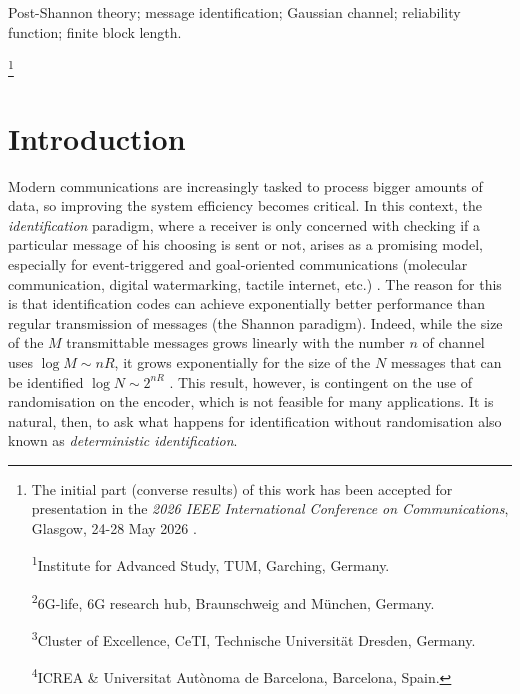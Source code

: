 \documentclass[10pt,conference]{IEEEtran}
\newcommand\blfootnote[1]{%
  \begingroup
  \renewcommand\thefootnote{}\footnote{#1}%
  \addtocounter{footnote}{-1}%
  \endgroup
}
\newcommand{\1}{\mathds{1}}
\begin{document}
\begin{IEEEkeywords}
Post-Shannon theory;
message identification;
Gaussian channel;
reliability function;
finite block length.
\end{IEEEkeywords}


\blfootnote{The initial part (converse results) of this work has been accepted for presentation in the  \textit{2026 IEEE International Conference on Communications}, Glasgow, 24-28 May 2026 \cite{CDBW:Gaussian_ICC}. 

{\textsuperscript{1}Institute for Advanced Study, TUM, Garching, Germany.}\vspace{1pt}

{\textsuperscript{2}6G-life, 6G research hub,
Braunschweig and M\"unchen,
Germany.}\vspace{1pt}

{\textsuperscript{3}Cluster of Excellence, CeTI, Technische Universität Dresden, Germany.}\vspace{1pt}

{\textsuperscript{4}ICREA {\&} Universitat Aut\`onoma de Barcelona, Barcelona, Spain.}
}


\section{Introduction}
Modern communications are increasingly tasked to process bigger amounts of data, so improving the system efficiency becomes critical. In this context, the \emph{identification} paradigm, where a receiver is only concerned with checking if a particular message of his choosing is sent or not, arises as a promising model, especially for event-triggered and goal-oriented communications (molecular communication, digital watermarking, tactile internet, etc.) \cite{6G_Book,6G_Book_2}. The reason for this is that identification codes can achieve exponentially better performance than regular transmission of messages (the Shannon paradigm). Indeed, while the size of the $M$ transmittable messages grows linearly with the number $n$ of channel uses $\log M\sim nR$, it grows exponentially for the size of the $N$ messages that can be identified $\log N\sim 2^{nR}$ \cite{AD:ID_ViaChannels,HanVerdu:ID}. This result, however, is contingent on the use of randomisation on the encoder, which is not feasible for many applications. It is natural, then, to ask what happens for identification without randomisation also known as \emph{deterministic identification}.
\end{document}

